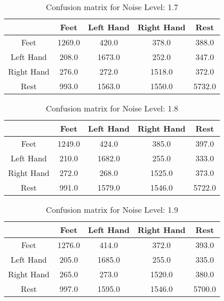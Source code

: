 \begin{table}[!htbp]
    \centering
    \begin{tabular}{|c||c|c|c|c|}
        \hline
		 & Feet & Left Hand & Right Hand & Rest \\
        \hline
        \hline
        Feet & 1269.0 & 420.0 & 378.0 & 388.0 \\
        \hline
        Left Hand & 208.0 & 1673.0 & 252.0 & 347.0 \\
        \hline
        Right Hand & 276.0 & 272.0 & 1518.0 & 372.0 \\
        \hline
        Rest & 993.0 & 1563.0 & 1550.0 & 5732.0 \\
        \hline
    \end{tabular}
    \caption{Confusion matrix for Noise Level: 1.7}
\end{table}

\begin{table}[!htbp]
    \centering
    \begin{tabular}{|c||c|c|c|c|}
        \hline
		 & Feet & Left Hand & Right Hand & Rest \\
        \hline
        \hline
        Feet & 1249.0 & 424.0 & 385.0 & 397.0 \\
        \hline
        Left Hand & 210.0 & 1682.0 & 255.0 & 333.0 \\
        \hline
        Right Hand & 272.0 & 268.0 & 1525.0 & 373.0 \\
        \hline
        Rest & 991.0 & 1579.0 & 1546.0 & 5722.0 \\
        \hline
    \end{tabular}
    \caption{Confusion matrix for Noise Level: 1.8}
\end{table}

\begin{table}[!htbp]
    \centering
    \begin{tabular}{|c||c|c|c|c|}
        \hline
		 & Feet & Left Hand & Right Hand & Rest \\
        \hline
        \hline
        Feet & 1276.0 & 414.0 & 372.0 & 393.0 \\
        \hline
        Left Hand & 205.0 & 1685.0 & 255.0 & 335.0 \\
        \hline
        Right Hand & 265.0 & 273.0 & 1520.0 & 380.0 \\
        \hline
        Rest & 997.0 & 1595.0 & 1546.0 & 5700.0 \\
        \hline
    \end{tabular}
    \caption{Confusion matrix for Noise Level: 1.9}
\end{table}

